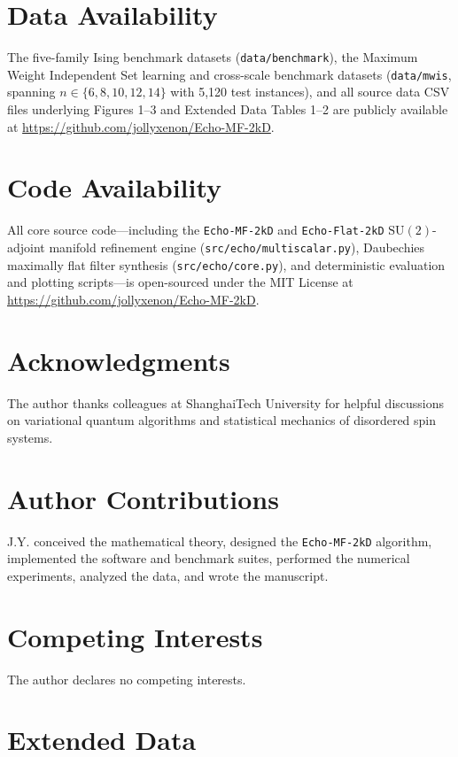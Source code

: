 \documentclass[10pt,a4paper]{article}
\begin{document}
\section*{Data Availability}
The five-family Ising benchmark datasets (\texttt{data/benchmark}), the Maximum Weight Independent Set learning and cross-scale benchmark datasets (\texttt{data/mwis}, spanning $n \in \{6, 8, 10, 12, 14\}$ with 5,120 test instances), and all source data CSV files underlying Figures 1--3 and Extended Data Tables 1--2 are publicly available at \url{https://github.com/jollyxenon/Echo-MF-2kD}.

\section*{Code Availability}
All core source code---including the \texttt{Echo-MF-2kD} and \texttt{Echo-Flat-2kD} $\mathrm{SU}(2)$-adjoint manifold refinement engine (\texttt{src/echo/multiscalar.py}), Daubechies maximally flat filter synthesis (\texttt{src/echo/core.py}), and deterministic evaluation and plotting scripts---is open-sourced under the MIT License at \url{https://github.com/jollyxenon/Echo-MF-2kD}.

\section*{Acknowledgments}
The author thanks colleagues at ShanghaiTech University for helpful discussions on variational quantum algorithms and statistical mechanics of disordered spin systems.

\section*{Author Contributions}
J.Y. conceived the mathematical theory, designed the \texttt{Echo-MF-2kD} algorithm, implemented the software and benchmark suites, performed the numerical experiments, analyzed the data, and wrote the manuscript.

\section*{Competing Interests}
The author declares no competing interests.




\clearpage
\section*{Extended Data}
\renewcommand{\tablename}{Extended Data Table}
\setcounter{table}{0}
\end{document}
